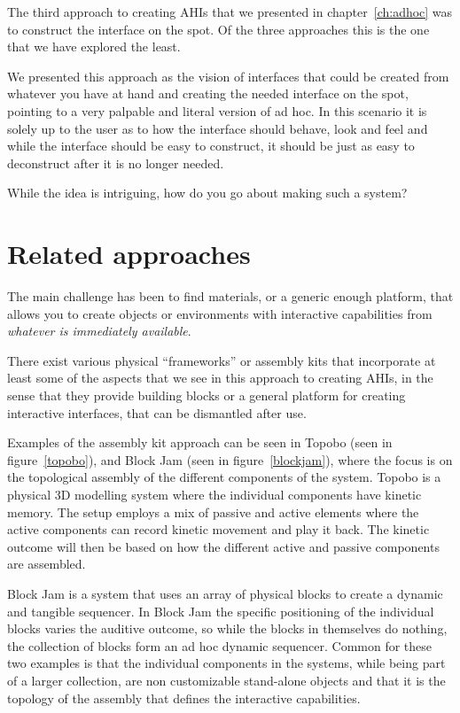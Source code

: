 \label{ch:prototype3}
The third approach to creating AHIs that we presented in chapter~\ref{ch:adhoc} was to construct the interface on the spot.
Of the three approaches this is the one that we have explored the least.

We presented this approach as the vision of interfaces that could be created from whatever you have at hand and creating the needed interface on the spot, pointing to a very palpable and literal version of ad hoc.
In this scenario it is solely up to the user as to how the interface should behave, look and feel and while the interface should be easy to construct, it should be just as easy to deconstruct after it is no longer needed.

While the idea is intriguing, how do you go about making such a system?

\section{Related approaches}
The main challenge has been to find materials, or a generic enough platform, that allows you to create objects or environments with interactive capabilities from \emph{whatever is immediately available}. 

There exist various physical ``frameworks'' or assembly kits that incorporate at least some of the aspects that we see in this approach to creating AHIs, in the sense that they provide building blocks or a general platform for creating interactive interfaces, that can be dismantled after use.

Examples of the assembly kit approach can be seen in Topobo \citep{raffle2004topobo} (seen in figure~\ref{topobo}), and Block Jam \citep{newton2003block} (seen in figure~\ref{blockjam}), where the focus is on the topological assembly of the different components of the system. 
Topobo is a physical 3D modelling system where the individual components have kinetic memory. 
The setup employs a mix of passive and active elements where the active components can record kinetic movement and play it back.
The kinetic outcome will then be based on how the different active and passive components are assembled.

Block Jam is a system that uses an array of physical blocks to create a dynamic and tangible sequencer.
In Block Jam the specific positioning of the individual blocks varies the auditive outcome, so while the blocks in themselves do nothing, the collection of blocks form an ad hoc dynamic sequencer.
Common for these two examples is that the individual components in the systems, while being part of a larger collection, are non customizable stand-alone objects and that it is the topology of the assembly that defines the interactive capabilities.

